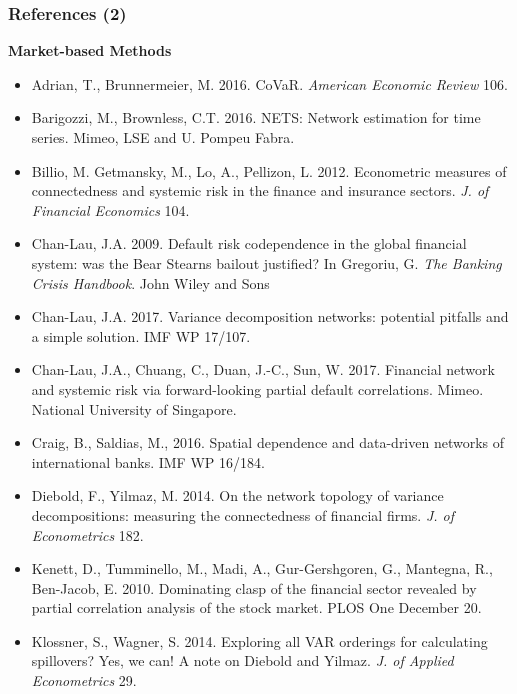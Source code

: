 \documentclass[aspectratio=43,dvipsnames,usenames, svgnames]{beamer}
\begin{document}
\begin{frame} %
\frametitle{References (2)}
\scriptsize{\textbf{Market-based Methods}}
\tiny{
\begin{itemize}
	\item Adrian, T., Brunnermeier, M. 2016. CoVaR. \textit{American Economic Review} 106.
	\item Barigozzi, M., Brownless, C.T. 2016. NETS: Network estimation for time series. Mimeo, LSE and U. Pompeu Fabra.
	\item Billio, M. Getmansky, M., Lo, A., Pellizon, L. 2012. Econometric measures of connectedness and systemic risk in the finance and insurance sectors. \textit{J. of Financial Economics} 104.
	\item Chan-Lau, J.A. 2009. Default risk codependence in the global financial system: was the Bear Stearns bailout justified? In Gregoriu, G. \textit{The Banking Crisis Handbook}. John Wiley and Sons
	\item Chan-Lau, J.A. 2017. Variance decomposition networks: potential pitfalls and a simple solution. IMF WP 17/107.
	\item Chan-Lau, J.A., Chuang, C., Duan, J.-C., Sun, W. 2017. Financial network and systemic risk via forward-looking partial default correlations. Mimeo. National University of Singapore.
	\item Craig, B., Saldias, M., 2016. Spatial dependence and data-driven networks of international banks. IMF WP 16/184.
	\item Diebold, F., Yilmaz, M. 2014. On the network topology of variance decompositions: measuring the connectedness of financial firms. \textit{J. of Econometrics} 182.
	\item Kenett, D., Tumminello, M., Madi, A., Gur-Gershgoren, G., Mantegna, R., Ben-Jacob, E. 2010. Dominating clasp of the financial sector revealed by partial correlation analysis of the stock market. PLOS One December 20.
	\item Klossner, S., Wagner, S. 2014. Exploring all VAR orderings for calculating spillovers? Yes, we can! A note on Diebold and Yilmaz. \textit{J. of Applied Econometrics} 29.
\end{itemize}
}
\end{frame}
\end{document}
